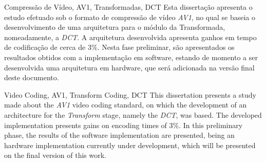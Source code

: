 \TitlePage
  \vspace*{55mm}
       {Compressão de Vídeo, AV1, Transformadas, DCT}
       {Esta dissertação apresenta o estudo efetuado sob o formato de compressão de vídeo \emph{AV1}, no qual se baseia o desenvolvimento de uma arquitetura para o módulo da Transformada, nomeadamente, a \emph{DCT}. A arquitetura desenvolvida apresenta ganhos em tempo de codificação de cerca de $3\%$.}
  \TEXT{}
       {Nesta fase preliminar, são apresentados os resultados obtidos com a implementação em software, estando de momento a ser desenvolvida uma arquitetura em hardware, que será adicionada na versão final deste documento.}
\EndTitlePage
\titlepage\ \endtitlepage %

\TitlePage
  \vspace*{55mm}
       {Video Coding, AV1, Transform Coding, DCT}
       {This dissertation presents a study made about the \emph{AV1} video coding standard, on which the development of an architecture for the \emph{Transform} stage, namely the \emph{DCT}, was based. The developed implementation presents gains on encoding times of $3\%$.}
  \TEXT{}
       {In this preliminary phase, the results of the software implementation are presented, being an hardware implementation currently under development, which will be presented on the final version of this work.}
\EndTitlePage
\titlepage\ \endtitlepage %

